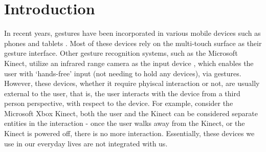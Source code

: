 \documentclass[conference]{IEEEtran}
\begin{document}
\section{Introduction}
In recent years, gestures have been incorporated in various mobile devices such as phones and tablets \cite{androidgestures,bbgeestures,bbgesturesz10}. Most of these devices rely on the multi-touch surface as their gesture interface. Other gesture recognition systems, such as the Microsoft Kinect, utilize an infrared range camera as the input device \cite{msprimesense2010press}, which enables the user with `hands-free' input (not needing to hold any devices), via gestures. However, these devices, whether it require phyiscal interaction or not, are usually external to the user, that is, the user interacts with the device from a third person perspective, with respect to the device. For example, consider the Microsoft Xbox Kinect, both the user and the Kinect can be considered separate entities in the interaction - once the user walks away from the Kinect, or the Kinect is powered off, there is no more interaction. Essentially, these devices we use in our everyday lives are not integrated with us.
\end{document}
